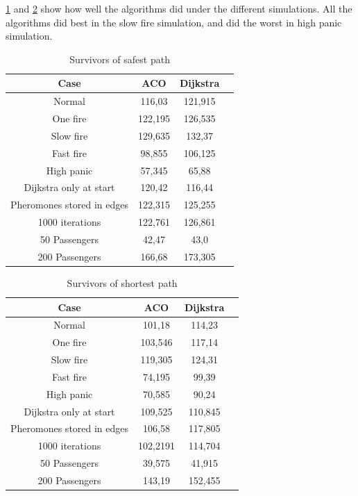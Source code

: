 \ref{table:tableSafest} and \ref{table:tableShortest} show how well the algorithms did under the different simulations. All the algorithms did best in the slow fire simulation, and did the worst in high panic simulation.

\begin{table}[ht]
\caption{Survivors of safest path} 				%
\centering										%
\begin{tabular}{c c c c}						%
\hline
\hline 											%
Case & ACO & Dijkstra \\[0.5ex]%
\hline											%
Normal & 116,03 & 121,915 \\							%
One fire & 122,195 & 126,535 \\
Slow fire & 129,635 & 132,37 \\
Fast fire & 98,855 & 106,125 \\
High panic & 57,345 & 65,88 \\
Dijkstra only at start & 120,42 & 116,44 \\
Pheromones stored in edges & 122,315 & 125,255 \\
1000 iterations & 122,761 & 126,861 \\
50 Passengers & 42,47 & 43,0 \\
200 Passengers & 166,68 & 173,305 \\ [1ex]						%
\hline														%

\end{tabular}
\label{table:tableSafest}								
\end{table}


\begin{table}[ht]
\caption{Survivors of shortest path} 				%
\centering										%
\begin{tabular}{c c c c}						%
\hline
\hline 											%
Case & ACO & Dijkstra \\[0.5ex]%
\hline											%
Normal & 101,18 & 114,23 \\							%
One fire & 103,546 & 117,14 \\
Slow fire & 119,305 & 124,31 \\
Fast fire & 74,195 & 99,39 \\
High panic & 70,585 & 90,24 \\
Dijkstra only at start & 109,525 & 110,845 \\
Pheromones stored in edges & 106,58 & 117,805 \\
1000 iterations & 102,2191 & 114,704 \\
50 Passengers & 39,575 & 41,915 \\ 
200 Passengers & 143,19 & 152,455 \\ [1ex]						%
\hline														%

\end{tabular}
\label{table:tableShortest}								
\end{table}